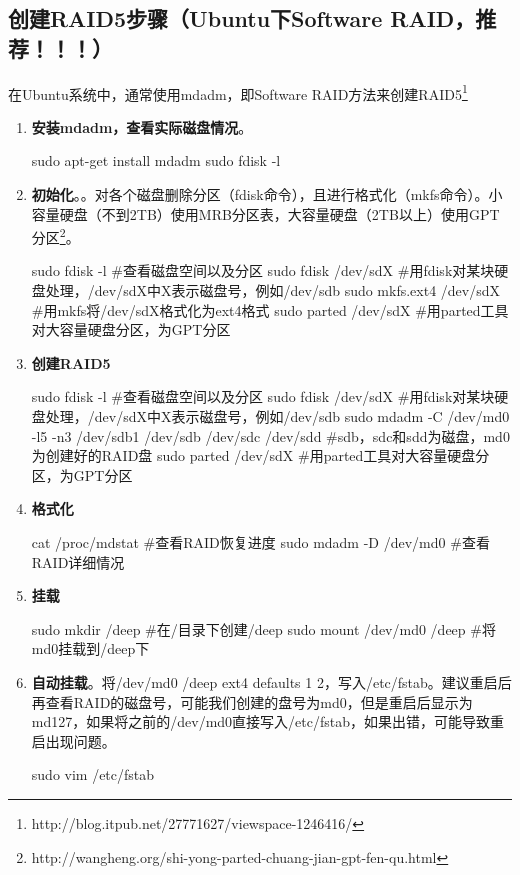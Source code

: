 \subsection{创建RAID5步骤（Ubuntu下Software RAID，推荐！！！）}
在Ubuntu系统中，通常使用mdadm，即Software RAID方法来创建RAID5\footnote{http://blog.itpub.net/27771627/viewspace-1246416/}
\begin{enumerate}
\item \textbf{安装mdadm，查看实际磁盘情况}。
\begin{bash}
sudo apt-get install mdadm
sudo fdisk -l
\end{bash}
\item \textbf{初始化}。。对各个磁盘删除分区（fdisk命令），且进行格式化（mkfs命令）。小容量硬盘（不到2TB）使用MRB分区表，大容量硬盘（2TB以上）使用GPT分区\footnote{http://wangheng.org/shi-yong-parted-chuang-jian-gpt-fen-qu.html}。
\begin{bash}
sudo fdisk -l		   #查看磁盘空间以及分区
sudo fdisk /dev/sdX  #用fdisk对某块硬盘处理，/dev/sdX中X表示磁盘号，例如/dev/sdb
sudo mkfs.ext4 /dev/sdX    #用mkfs将/dev/sdX格式化为ext4格式
sudo parted /dev/sdX	#用parted工具对大容量硬盘分区，为GPT分区
\end{bash}
\item \textbf{创建RAID5}
\begin{bash}
sudo fdisk -l		   #查看磁盘空间以及分区
sudo fdisk /dev/sdX  #用fdisk对某块硬盘处理，/dev/sdX中X表示磁盘号，例如/dev/sdb
sudo mdadm -C /dev/md0 -l5 -n3 /dev/sdb1 /dev/sdb /dev/sdc /dev/sdd   #sdb，sdc和sdd为磁盘，md0为创建好的RAID盘
sudo parted /dev/sdX	#用parted工具对大容量硬盘分区，为GPT分区
\end{bash}
\item \textbf{格式化}
\begin{bash}
cat /proc/mdstat	#查看RAID恢复进度
sudo mdadm -D /dev/md0  #查看RAID详细情况
\end{bash} 
\item \textbf{挂载}
\begin{bash}
sudo mkdir /deep		#在/目录下创建/deep
sudo mount /dev/md0 /deep  	#将md0挂载到/deep下
\end{bash} 
\item \textbf{自动挂载}。将/dev/md0 /deep ext4 defaults 1 2，写入/etc/fstab。建议重启后再查看RAID的磁盘号，可能我们创建的盘号为md0，但是重启后显示为md127，如果将之前的/dev/md0直接写入/etc/fstab，如果出错，可能导致重启出现问题。
\begin{bash}
sudo vim /etc/fstab 
\end{bash}
\end{enumerate}




